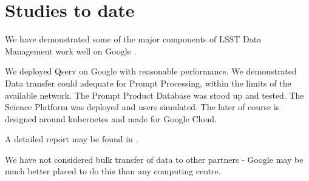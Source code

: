 \section{Studies to date}
We have demonstrated some of the major components of \gls{LSST} \gls{Data Management} work well on Google  .

We deployed \gls{Qserv} on Google with reasonable performance.
We demonstrated Data transfer  could adequate for \gls{Prompt Processing}, within the limits of the available network.
The Prompt Product Database was  stood up and tested.  The  \gls{Science Platform} was deployed and users simulated.
The later of course is designed around kubernetes and made for Google Cloud.

A detailed report may be found in .

We have not considered bulk transfer of data to other partners - Google may be much better placed to do this than any computing centre.



